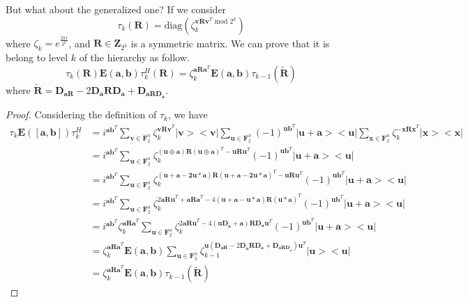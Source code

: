\noindent But what about the generalized one? If we consider 
\begin{equation}\label{DiagDefGen}
	\tau_k\left(\mathbf{R}\right) = \text{diag}\left( \zeta_k^{ \mathbf{v R v}^T \text{  mod  } 2^k} \right)
\end{equation}
where $\zeta_k = e^{\frac{2\pi i}{2^k}}$, and $\mathbf{R} \in \mathbf{Z}_{2^k}$ is a symmetric matrix. We can prove that it is belong to level $k$ of the hierarchy as follow. 
\begin{equation}\label{ConjRes}
	\tau_k\left(\mathbf{R}\right)\mathbf{E}\left(\mathbf{a, b} \right)\tau_k^H\left(\mathbf{R}\right) = \zeta_k^{\mathbf{aRa}^T}\mathbf{E}\left(\mathbf{a, b}\right) \tau_{k-1}\left(\tilde{\mathbf{R}} \right)
\end{equation}
where $\tilde{\mathbf{R}} = \mathbf{D}_{\mathbf{aR}}-2 \mathbf{\mathbf{D}_{\overline{\mathbf{a}}}}\mathbf{R}\mathbf{D}_{\mathbf{a}} +\mathbf{D}_{\mathbf{aRD}_{\mathbf{a}}}$.
\begin{proof}
	Considering the definition of $\tau_k$, we have
	\begin{align}
		\tau_k  \mathbf{E}\left( \left[\mathbf{a, b}\right]\right) \tau_k^H& = i^{\mathbf{ab}^T} \sum_{\mathbf{v}\in \mathbf{F}_2^n}{\zeta_k^{\mathbf{v R v}^T} |\mathbf{v}><\mathbf{v}|}\sum_{\mathbf{u}\in \mathbf{F}_2^n}{(-1)^{\mathbf{u b}^T} |\mathbf{u+a}><\mathbf{u}|}\sum_{\mathbf{x}\in \mathbf{F}_2^n}{\zeta_k^{-\mathbf{x R x}^T} |\mathbf{x}><\mathbf{x}|} \nonumber \\
		&= i^{\mathbf{ab}^T} \sum_{\mathbf{u}\in \mathbf{F}_2^n}{ \zeta_k^{\left(\mathbf{u\oplus a}\right)\mathbf{R}\left(\mathbf{u \oplus a}\right)^T-\mathbf{u R u}^T } (-1)^{\mathbf{u b}^T} |\mathbf{u+a}><\mathbf{u}|} \nonumber\\
		&= i^{\mathbf{ab}^T} \sum_{\mathbf{u}\in \mathbf{F}_2^n}{ \zeta_k^{\left(\mathbf{u+ a-2u*a}\right)\mathbf{R}\left(\mathbf{u + a-2u*a}\right)^T-\mathbf{u R u}^T } (-1)^{\mathbf{u b}^T} |\mathbf{u+a}><\mathbf{u}|} \nonumber \\
		&= i^{\mathbf{ab}^T } \sum_{\mathbf{u}\in \mathbf{F}_2^n}{ \zeta_k^{2\mathbf{aRu}^T+\mathbf{aRa}^T -4\left( \mathbf{u+a-u*a}\right)\mathbf{R}\left(\mathbf{u*a}\right)^T} (-1)^{\mathbf{u b}^T} |\mathbf{u+a}><\mathbf{u}|} \nonumber \\
		&= i^{\mathbf{ab}^T }\zeta_k^{\mathbf{aRa}^T} \sum_{\mathbf{u}\in \mathbf{F}_2^n}{ \zeta_k^{2\mathbf{aRu}^T-4\left( \mathbf{u\mathbf{D}_{\overline{\mathbf{a}}}+a}\right)\mathbf{R}\mathbf{D}_{\mathbf{a}} \mathbf{u}^T } (-1)^{\mathbf{u b}^T} |\mathbf{u+a}><\mathbf{u}|} \nonumber \\
		&= \zeta_k^{\mathbf{aRa}^T}\mathbf{E}\left(\mathbf{a, b}\right) \sum_{\mathbf{u}\in \mathbf{F}_2^n}{ \zeta_{k-1}^{\mathbf{u}\left(\mathbf{D}_{\mathbf{aR}}-2 \mathbf{\mathbf{D}_{\overline{\mathbf{a}}}}\mathbf{R}\mathbf{D}_{\mathbf{a}} +\mathbf{D}_{\mathbf{aRD}_{\mathbf{a}}}\right) \mathbf{u}^T } |\mathbf{u}><\mathbf{u}|} \nonumber \\
		&= \zeta_k^{\mathbf{aRa}^T}\mathbf{E}\left(\mathbf{a, b}\right) \tau_{k-1}\left(\tilde{\mathbf{R}} \right)
	\end{align}

\end{proof}
